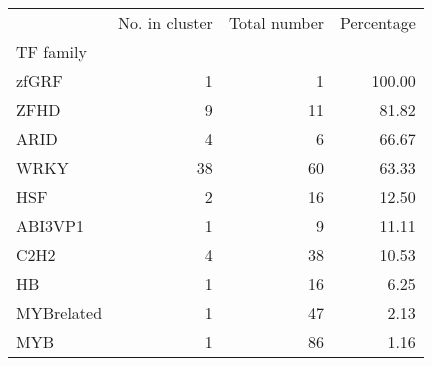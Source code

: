 \begin{tabular}{lrrr}
\toprule
{} &  No. in cluster &  Total number &  Percentage \\
TF family  &                 &               &             \\
\midrule
zfGRF      &               1 &             1 &      100.00 \\
ZFHD       &               9 &            11 &       81.82 \\
ARID       &               4 &             6 &       66.67 \\
WRKY       &              38 &            60 &       63.33 \\
HSF        &               2 &            16 &       12.50 \\
ABI3VP1    &               1 &             9 &       11.11 \\
C2H2       &               4 &            38 &       10.53 \\
HB         &               1 &            16 &        6.25 \\
MYBrelated &               1 &            47 &        2.13 \\
MYB        &               1 &            86 &        1.16 \\
\bottomrule
\end{tabular}
